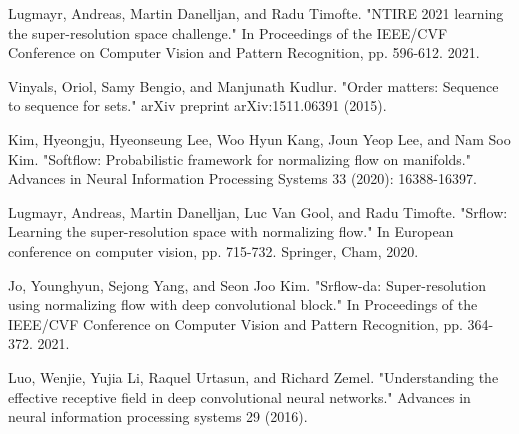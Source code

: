 \documentclass{article}
\begin{document}
\begin{thebibliography}{9}
    Lugmayr, Andreas, Martin Danelljan, and Radu Timofte. "NTIRE 2021 learning the super-resolution space challenge." In Proceedings of the IEEE/CVF Conference on Computer Vision and Pattern Recognition, pp. 596-612. 2021.
    
    Vinyals, Oriol, Samy Bengio, and Manjunath Kudlur. "Order matters: Sequence to sequence for sets." arXiv preprint arXiv:1511.06391 (2015).

    Kim, Hyeongju, Hyeonseung Lee, Woo Hyun Kang, Joun Yeop Lee, and Nam Soo Kim. "Softflow: Probabilistic framework for normalizing flow on manifolds." Advances in Neural Information Processing Systems 33 (2020): 16388-16397.    

    Lugmayr, Andreas, Martin Danelljan, Luc Van Gool, and Radu Timofte. "Srflow: Learning the super-resolution space with normalizing flow." In European conference on computer vision, pp. 715-732. Springer, Cham, 2020.
     
    Jo, Younghyun, Sejong Yang, and Seon Joo Kim. "Srflow-da: Super-resolution using normalizing flow with deep convolutional block." In Proceedings of the IEEE/CVF Conference on Computer Vision and Pattern Recognition, pp. 364-372. 2021.

    Luo, Wenjie, Yujia Li, Raquel Urtasun, and Richard Zemel. "Understanding the effective receptive field in deep convolutional neural networks." Advances in neural information processing systems 29 (2016).


\end{thebibliography}
\end{document}
